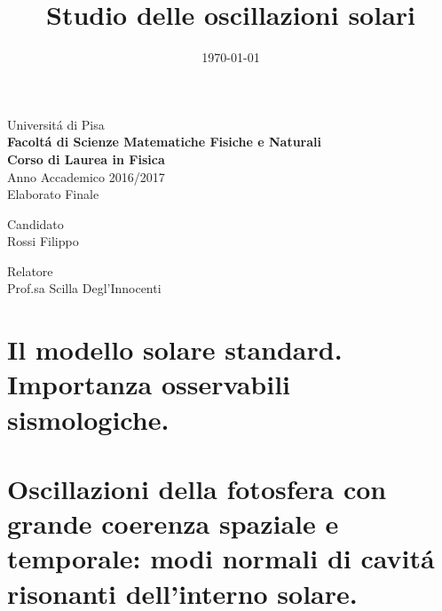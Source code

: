 \documentclass[twoside,11pt,openany,fleqn]{memoir}%
\author{ }
\title{Studio delle oscillazioni solari}
\date{\today}
\makeatletter
\newcommand{\titolo}{\@title}
\makeatother
\begin{document}
\begingroup

\thispagestyle{empty}
\begin{center}
\Huge Universit\'a di Pisa\\ \vspace{1cm}\textbf{\huge Facolt\'a di Scienze Matematiche Fisiche e Naturali}\\ \vspace{2cm} \textbf{\LARGE Corso di Laurea in Fisica}\\\Large Anno Accademico 2016/2017\\ \vspace{5cm} \LARGE Elaborato Finale\\ \vspace{1cm} \huge\titolo

\end{center}

\vspace{9cm}

\begin{minipage}[l]{0.5\textwidth}\Large
Candidato\\
Rossi Filippo
\end{minipage}
\begin{minipage}[r]{0.5\textwidth}\Large
Relatore\\Prof.sa Scilla Degl'Innocenti
\end{minipage}

\endgroup

\cleartorecto

\tableofcontents*

%

{}

\mainmatter


\cleartorecto
\part{Il modello solare standard. Importanza osservabili sismologiche.}



\cleartorecto
\part{Oscillazioni della fotosfera con grande coerenza spaziale e temporale: modi normali di cavit\'a risonanti dell'interno solare.}
\end{document}
